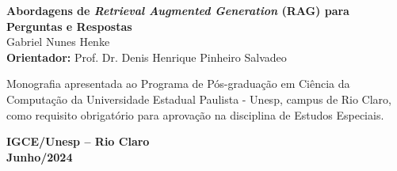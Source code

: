 
\newpage
\thispagestyle{empty}

\begin{center}
    \vspace*{1cm} %
    {\Large \textbf{Abordagens de \textit{Retrieval Augmented Generation} (RAG) para Perguntas e Respostas}\\}
    \vspace{2.5cm} %
    {Gabriel Nunes Henke\\}
    \vspace{2.5cm} %
    \textbf{Orientador:} Prof. Dr. Denis Henrique Pinheiro Salvadeo
    \vspace{4cm} %
    
    \hspace{.45\linewidth}
    \begin{minipage}{.50\linewidth}
           Monografia apresentada ao Programa de Pós-graduação em Ciência da Computação da 
           Universidade Estadual Paulista - Unesp, campus de Rio Claro, como requisito obrigatório para aprovação na disciplina de Estudos Especiais.
    \end{minipage}

    \vspace{4cm} %
    \textbf{
    IGCE/Unesp – Rio Claro \\
    Junho/2024
    }
\end{center}



% 
